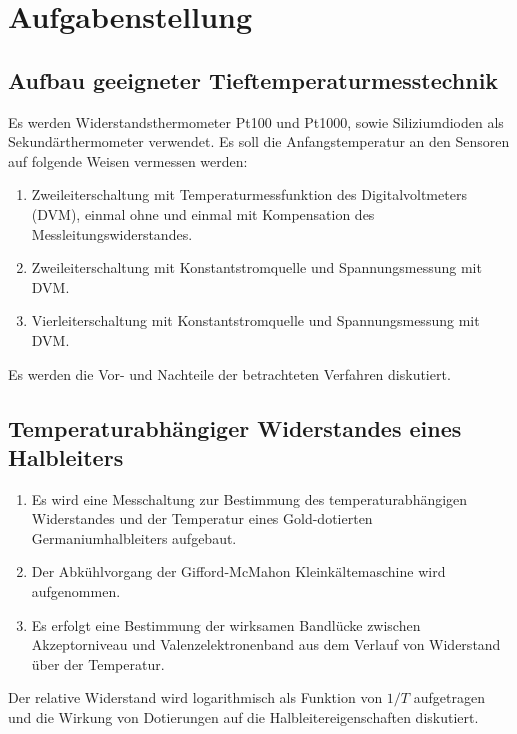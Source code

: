 \documentclass[parskip=half, a4paper,twoside,final]{article}
\begin{document}
\section{Aufgabenstellung} \label{sec:Aufgabenstellung}

\subsection{Aufbau geeigneter Tieftemperaturmesstechnik}

Es werden Widerstandsthermometer Pt100 und Pt1000, sowie Siliziumdioden als Sekundärthermometer verwendet. Es soll die Anfangstemperatur an den Sensoren auf folgende Weisen vermessen werden:
\begin{enumerate}
  \item Zweileiterschaltung mit Temperaturmessfunktion des Digitalvoltmeters (DVM), einmal ohne und einmal mit Kompensation des Messleitungswiderstandes.
  \item Zweileiterschaltung mit Konstantstromquelle und Spannungsmessung mit DVM.
  \item Vierleiterschaltung mit Konstantstromquelle und Spannungsmessung mit DVM.
\end{enumerate}

Es werden die Vor- und Nachteile der betrachteten Verfahren diskutiert.

\subsection{Temperaturabhängiger Widerstandes eines Halbleiters}

\begin{enumerate}
  \item Es wird eine Messchaltung zur Bestimmung des temperaturabhängigen Widerstandes und der Temperatur eines Gold-dotierten Germaniumhalbleiters aufgebaut.
  \item Der Abkühlvorgang der Gifford-McMahon Kleinkältemaschine wird aufgenommen.
  \item Es erfolgt eine Bestimmung der wirksamen Bandlücke zwischen Akzeptorniveau und Valenzelektronenband aus dem Verlauf von Widerstand über der Temperatur.
\end{enumerate}
Der relative Widerstand wird logarithmisch als Funktion von $1/T$ aufgetragen und die Wirkung von Dotierungen auf die Halbleitereigenschaften diskutiert.
\end{document}
